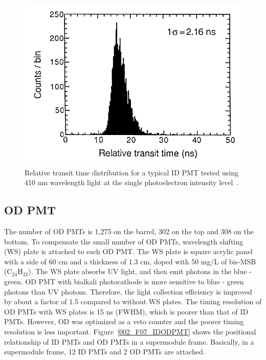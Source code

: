 \begin{figure}[tbp]
	\centering
	\includegraphics[width=12cm]{Figures/002/F06_IDPMTt}
	\caption[Relative transit time distribution for a typical ID PMT tested using 410 nm wavelength light at the single photoelectron intensity level]{\label{002_F06_IDPMTt} Relative transit time distribution for a typical ID PMT tested using 410 nm wavelength light at the single photoelectron intensity level~\cite{2003Fukuda}.}
\end{figure}

\subsection{OD PMT}
\vs\hs The number of OD PMTs is 1,275 on the barrel, 302 on the top and 308 on the bottom.
To compensate the small number of OD PMTs, wavelength shifting (WS) plate is attached to each OD PMT.
The WS plate is square acrylic panel with a side of 60 cm and a thickness of 1.3 cm, doped with 50 mg$/$L of bis-MSB (C$_{\text{24}}$H$_{\text{22}}$).
The WS plate absorbs UV light, and then emit photons in the blue - green.
OD PMT with bialkali photocathode is more sensitive to blue - green photons than UV photons.
Therefore, the light collection efficiency is improved by about a factor of 1.5 compared to without WS plates.
The timing resolution of OD PMTs with WS plates is 15 ns (FWHM), which is poorer than that of ID PMTs.
However, OD was optimized as a veto counter and the poorer timing resolution is less important.
Figure~\ref{002_F07_IDODPMT} shows the positional relationship of ID PMTs and OD PMTs in a supermodule frame.
Basically, in a supermodule frame, 12 ID PMTs and 2 OD PMTs are attached.

